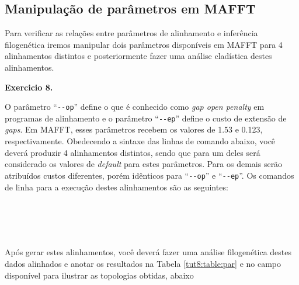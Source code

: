 \begin{refsection}
\subsection{Manipulação de parâmetros em MAFFT}\label{tut8:par:op}

Para verificar as relações entre parâmetros de alinhamento e inferência filogenética iremos manipular dois parâmetros disponíveis em MAFFT para 4 alinhamentos distintos e posteriormente fazer uma análise cladística destes alinhamentos.\\


\begin{blackBlock}{\textbf{Exercicio 8.}}\label{tut8:ex:8.7}

O parâmetro ``\texttt{-{}-op}'' define o que é conhecido como \textit{gap open penalty} em programas de alinhamento e o parâmetro ``\texttt{-{}-ep}'' define o custo de extensão de \textit{gaps}. Em MAFFT, esses parâmetros recebem os valores de 1.53 e 0.123, respectivamente. Obedecendo a sintaxe das linhas de comando abaixo, você deverá produzir 4 alinhamentos distintos, sendo que para um deles será considerado os valores de \textit{default} para estes parâmetros. Para os demais serão atribuídos custos diferentes, porém idênticos para ``\texttt{-{}-op}'' e ``\texttt{-{}-ep}''. Os comandos de linha para a execução destes alinhamentos são as seguintes:\\

\scriptsize
{}\\
\indent{}\\
\indent{}\\
\indent{}\\
\normalsize

Após gerar estes alinhamentos, você deverá fazer uma análise filogenética destes dados alinhados e anotar os resultados na Tabela \ref{tut8:table:par} e no campo disponível para ilustrar as topologias obtidas, abaixo

\end{blackBlock}

\newpage
\pagestyle{fancy}
\begin{center}


\end{center}
\end{refsection}
